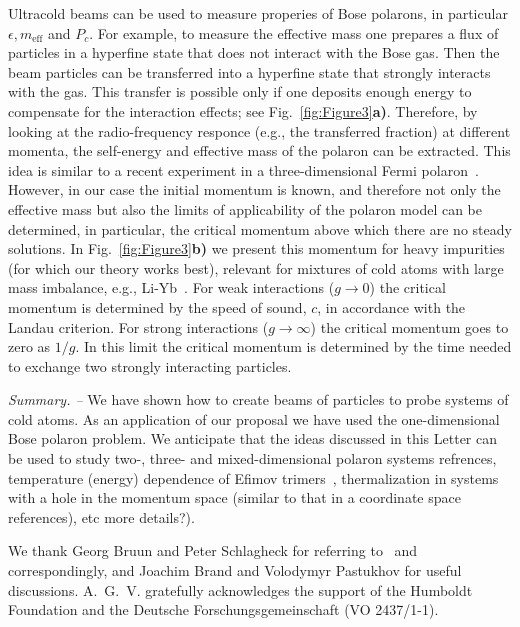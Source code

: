 \documentclass[twocolumn,amsmath,amssymb,showpacs,prl,superscriptaddress,aps]{revtex4-1}
\begin{document}
Ultracold beams can be used to measure properies of Bose polarons, in particular $\epsilon, m_{\mathrm{eff}}$ and $P_c$.
For example, to measure the effective 
mass one prepares a flux of particles in a hyperfine state that does not 
interact with the Bose gas. Then the beam particles can be transferred into a hyperfine state that strongly interacts with the gas.
This transfer is possible only if one deposits enough energy to compensate for the interaction effects; see Fig.~\ref{fig:Figure3}{\bf a)}. 
Therefore, by looking at the radio-frequency responce (e.g., the transferred fraction) at different momenta, the self-energy and effective mass 
of the polaron can be extracted. 
This idea is similar to a recent experiment in a three-dimensional Fermi polaron~\cite{zaccanti2017}. However,
in our case the initial momentum is known, and therefore not only the effective mass but also the limits of applicability 
of the polaron model can be determined, in particular, the critical momentum above which there are no steady solutions.
In Fig.~\ref{fig:Figure3}{\bf b)} we present this momentum for heavy impurities (for which our theory works best), relevant 
for mixtures of cold atoms with large mass imbalance, e.g., Li-Yb~\cite{takahashi2018}.
For weak interactions ($g\to 0$) the critical momentum is determined by the speed of sound, $c$, in accordance with the Landau criterion.
For strong interactions ($g\to \infty$) the critical momentum goes to zero as $1/g$.  
In this limit the critical momentum is determined by the time needed to exchange two strongly interacting particles. 
 



{\it Summary. --}  We have shown how to create beams of particles to probe systems of cold atoms. 
As an application of our proposal we have used the one-dimensional Bose polaron problem. We anticipate that the ideas discussed in this Letter can be used to study two-, three- and mixed-dimensional polaron systems {\color{blue} refrences}, temperature (energy) dependence of Efimov trimers~\cite{naidon2011, huang2015, wacker2018}, thermalization in systems with a hole in the momentum space (similar to that in a coordinate space {\color{blue} references}), etc {\color{blue} more details?}).






\begin{acknowledgments}
We thank Georg Bruun and Peter Schlagheck for referring to~\cite{zaccanti2017} and~\cite{Schlagheck2005}
correspondingly, and Joachim Brand and Volodymyr Pastukhov for useful discussions.
A.~G.~V. gratefully acknowledges the support of the Humboldt Foundation and the Deutsche Forschungsgemeinschaft
(VO 2437/1-1).
\end{acknowledgments}
\end{document}
